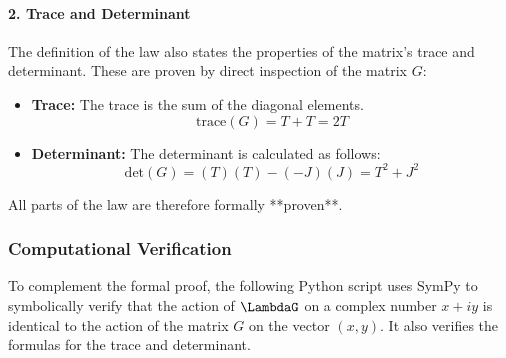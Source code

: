 \paragraph{2. Trace and Determinant}
The definition of the law also states the properties of the matrix's trace and determinant. These are proven by direct inspection of the matrix $G$:
\begin{itemize}
    \item \textbf{Trace:} The trace is the sum of the diagonal elements.
    $$ \text{trace}(G) = T + T = 2T $$
    \item \textbf{Determinant:} The determinant is calculated as follows:
    $$ \text{det}(G) = (T)(T) - (-J)(J) = T^2 + J^2 $$
\end{itemize}
All parts of the law are therefore formally **proven**.

\subsubsection*{Computational Verification}
To complement the formal proof, the following Python script uses SymPy to symbolically verify that the action of $\LambdaG$ on a complex number $x+iy$ is identical to the action of the matrix $G$ on the vector $(x,y)$. It also verifies the formulas for the trace and determinant.

